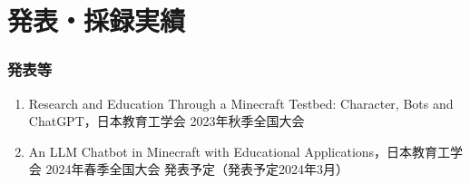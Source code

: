 \chapter*{発表・採録実績}


\subsection*{発表等}
\begin{enumerate}
\renewcommand{\labelenumi}{[\arabic{enumi}]}
    \item Research and Education Through a Minecraft Testbed: Character, Bots and ChatGPT，日本教育工学会 2023年秋季全国大会
    \item An LLM Chatbot in Minecraft with Educational Applications，日本教育工学会 2024年春季全国大会 発表予定（発表予定2024年3月）
\end{enumerate}
